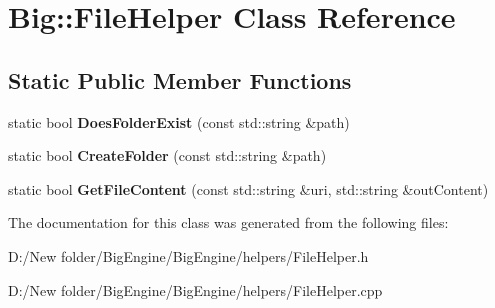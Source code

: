 \hypertarget{class_big_1_1_file_helper}{}\section{Big\+:\+:File\+Helper Class Reference}
\label{class_big_1_1_file_helper}
\subsection*{Static Public Member Functions}
\begin{DoxyCompactItemize}
\item 
\mbox{\label{class_big_1_1_file_helper_a785a2ee0a54e1e3647251966b75295e3}} 
static bool {\bfseries Does\+Folder\+Exist} (const std\+::string \&path)
\item 
\mbox{\label{class_big_1_1_file_helper_ade0d6dcd44a4c553597eac67f8efbb69}} 
static bool {\bfseries Create\+Folder} (const std\+::string \&path)
\item 
\mbox{\label{class_big_1_1_file_helper_a2cef67d03ab40d8a3c6712fad56ae86e}} 
static bool {\bfseries Get\+File\+Content} (const std\+::string \&uri, std\+::string \&out\+Content)
\end{DoxyCompactItemize}


The documentation for this class was generated from the following files\+:\begin{DoxyCompactItemize}
\item 
D\+:/\+New folder/\+Big\+Engine/\+Big\+Engine/helpers/File\+Helper.\+h\item 
D\+:/\+New folder/\+Big\+Engine/\+Big\+Engine/helpers/File\+Helper.\+cpp\end{DoxyCompactItemize}
